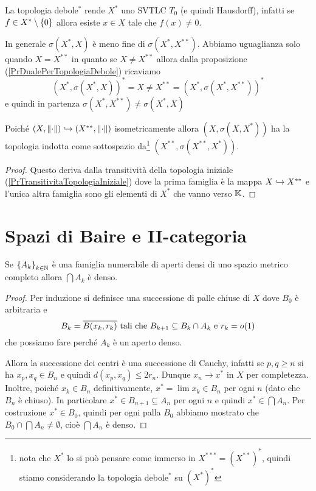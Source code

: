 \begin{remark}
La topologia debole$^\ast$ rende $X^\ast$ uno SVTLC $T_0$ (e quindi Hausdorff), infatti se $f\in X^\ast\setminus\{0\}$ allora esiste $x\in X$ tale che $f(x)\neq 0$.
\end{remark}

\begin{remark}
In generale $\sigma(X^\ast,X)$ \`e meno fine di $\sigma(X^\ast,X^{\ast\ast})$. Abbiamo uguaglianza solo quando $X=X^{\ast\ast}$ in quanto se $X\neq X^{\ast\ast}$ allora dalla proposizione (\ref{PrDualePerTopologiaDebole}) ricaviamo
\[(X^\ast,\sigma(X^\ast,X))^\ast=X\neq X^{\ast\ast}=(X^\ast,\sigma(X^\ast,X^{\ast\ast}))^\ast\]
e quindi in partenza $\sigma(X^\ast,X^{\ast\ast})\neq \sigma(X^\ast,X)$
\end{remark}

\begin{remark}
Poich\'e $(X,{\left\Vert{\cdot}\right\Vert})\hookrightarrow (X^{\ast\ast},{\left\Vert{\cdot}\right\Vert})$ isometricamente allora $(X,\sigma(X,X^\ast))$ ha la topologia indotta come sottospazio da\footnote{nota che $X^\ast$ lo si pu\`o pensare come immerso in $X^{\ast\ast\ast}=(X^{\ast\ast})^\ast$, quindi stiamo considerando la topologia debole$^\ast$ su $(X^{\ast})^\ast$} $(X^{\ast\ast},\sigma(X^{\ast\ast},X^\ast))$.
\end{remark}
\begin{proof}
Questo deriva dalla transitivit\`a della topologia iniziale (\ref{PrTransitivitaTopologiaIniziale}) dove la prima famiglia \`e la mappa $X\hookrightarrow X^{\ast\ast}$ e l'unica altra famiglia sono gli elementi di $X^\ast$ che vanno verso $\mathbb{K}$.
\end{proof}

\section{Spazi di Baire e II-categoria}
\begin{theorem}[Baire]\label{ThBaire}
Se $\left\{{A_k}\right\}_{k\in\mathbb{N}}$ \`e una famiglia numerabile di aperti densi di uno spazio metrico completo allora $\bigcap A_k$ \`e denso.
\end{theorem}
\begin{proof}
Per induzione si definisce una successione di palle chiuse di $X$ dove $B_0$ \`e arbitraria e
\[B_k=\overline{B(x_k,r_k)}\text{ tali che }B_{k+1}\subseteq B_k\cap A_k\text{ e }r_k=o(1)\]
che possiamo fare perch\'e $A_k$ \`e un aperto denso.

Allora la successione dei centri \`e una successione di Cauchy, infatti se $p,q\geq n$ si ha $x_p,x_q\in B_n$ e quindi $d(x_p,x_q)\leq 2r_n$. Dunque $x_n\to x^\ast$ in $X$ per completezza. Inoltre, poich\'e $x_k\in B_n$ definitivamente, $x^\ast=\lim x_k\in B_n$ per ogni $n$ (dato che $B_n$ \`e chiuso). In particolare $x^\ast\in B_{n+1}\subseteq A_n$ per ogni $n$ e quindi $x^\ast\in \bigcap A_n$. Per costruzione $x^\ast\in B_0$, quindi per ogni palla $B_0$ abbiamo mostrato che $B_0\cap \bigcap A_n\neq \emptyset$, cio\`e $\bigcap A_n$ \`e denso.
\end{proof}

